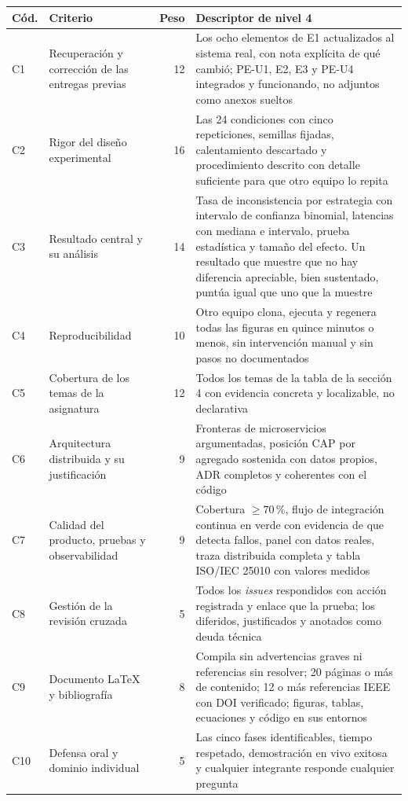 \documentclass[11pt,a4paper]{article}
\begin{document}
	\begin{center}
		\footnotesize
		\begin{longtable}{@{}p{0.8cm}p{5.2cm}rp{7.4cm}@{}}
			\toprule
			\textbf{Cód.} & \textbf{Criterio} & \textbf{Peso} & \textbf{Descriptor de nivel 4} \\
			\midrule
			\endhead
			C1 & Recuperación y corrección de las entregas previas & 12 & Los ocho elementos de E1 actualizados al sistema real, con nota explícita de qué cambió; PE-U1, E2, E3 y PE-U4 integrados y funcionando, no adjuntos como anexos sueltos \\
			\addlinespace
			C2 & Rigor del diseño experimental & 16 & Las 24 condiciones con cinco repeticiones, semillas fijadas, calentamiento descartado y procedimiento descrito con detalle suficiente para que otro equipo lo repita \\
			\addlinespace
			C3 & Resultado central y su análisis & 14 & Tasa de inconsistencia por estrategia con intervalo de confianza binomial, latencias con mediana e intervalo, prueba estadística y tamaño del efecto. Un resultado que muestre que no hay diferencia apreciable, bien sustentado, puntúa igual que uno que la muestre \\
			\addlinespace
			C4 & Reproducibilidad & 10 & Otro equipo clona, ejecuta y regenera todas las figuras en quince minutos o menos, sin intervención manual y sin pasos no documentados \\
			\addlinespace
			C5 & Cobertura de los temas de la asignatura & 12 & Todos los temas de la tabla de la sección 4 con evidencia concreta y localizable, no declarativa \\
			\addlinespace
			C6 & Arquitectura distribuida y su justificación & 9 & Fronteras de microservicios argumentadas, posición CAP por agregado sostenida con datos propios, ADR completos y coherentes con el código \\
			\addlinespace
			C7 & Calidad del producto, pruebas y observabilidad & 9 & Cobertura $\geq 70\,\%$, flujo de integración continua en verde con evidencia de que detecta fallos, panel con datos reales, traza distribuida completa y tabla ISO/IEC 25010 con valores medidos \\
			\addlinespace
			C8 & Gestión de la revisión cruzada & 5 & Todos los \emph{issues} respondidos con acción registrada y enlace que la prueba; los diferidos, justificados y anotados como deuda técnica \\
			\addlinespace
			C9 & Documento LaTeX y bibliografía & 8 & Compila sin advertencias graves ni referencias sin resolver; 20 páginas o más de contenido; 12 o más referencias IEEE con DOI verificado; figuras, tablas, ecuaciones y código en sus entornos \\
			\addlinespace
			C10 & Defensa oral y dominio individual & 5 & Las cinco fases identificables, tiempo respetado, demostración en vivo exitosa y cualquier integrante responde cualquier pregunta \\
			\bottomrule
		\end{longtable}
	\end{center}
	
\end{document}
